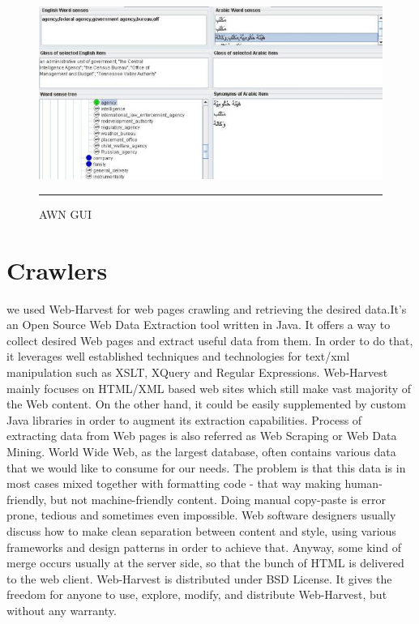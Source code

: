\begin{figure}[htbp]
	\begin{center}
		\includegraphics{./Figures/AWNGUI_1.jpg}
		\rule{20em}{0.5pt}
	\end{center}
	\caption[AWN GUI]{AWN GUI}
	\label{fig:AWN GUI}
\end{figure}

\section{Crawlers}
we used Web-Harvest for web pages crawling and retrieving the desired data.It’s an Open Source Web Data Extraction tool written in Java. It offers a way to collect desired Web pages and extract useful data from them. In order to do that, it leverages well established techniques and technologies for text/xml manipulation such as XSLT, XQuery and Regular Expressions. Web-Harvest mainly focuses on HTML/XML based web sites which still make vast majority of the Web content. On the other hand, it could be easily supplemented by custom Java libraries in order to augment its extraction capabilities.
Process of extracting data from Web pages is also referred as Web Scraping or Web Data Mining. World Wide Web, as the largest database, often contains various data that we would like to consume for our needs. The problem is that this data is in most cases mixed together with formatting code - that way making human-friendly, but not machine-friendly content. Doing manual copy-paste is error prone, tedious and sometimes even impossible. Web software designers usually discuss how to make clean separation between content and style, using various frameworks and design patterns in order to achieve that. Anyway, some kind of merge occurs usually at the server side, so that the bunch of HTML is delivered to the web client.
Web-Harvest is distributed under BSD License. It gives the freedom for anyone to use, explore, modify, and distribute Web-Harvest, but without any warranty. 
